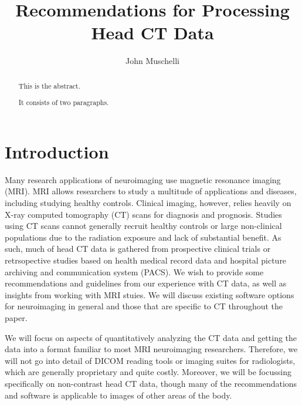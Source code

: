 \documentclass[]{elsarticle} %
\begin{document}
\begin{frontmatter}

  \title{Recommendations for Processing Head CT Data}
    \author[JHSPH]{John Muschelli}
  
      \address[JHSPH]{Johns Hopkins Bloomberg School of Public Health, Department of
Biostatistics, 615 N Wolfe St, Baltimore, MD, 21205}
    \address[JHMI]{Johns Hopkins Hospital, Department of Neurology, 601 N Caroline St,
Baltimore, MD 21205}
    \address[BIOS]{Brain Injury Outcomes, Johns Hopkins University, 750 East Pratt Street,
Baltimore, MD 21202}
  
  \begin{abstract}
  This is the abstract.
  
  It consists of two paragraphs.
  \end{abstract}
  
 \end{frontmatter}

\hypertarget{introduction}{%
\section{Introduction}\label{introduction}}

Many research applications of neuroimaging use magnetic resonance
imaging (MRI). MRI allows researchers to study a multitude of
applications and diseases, including studying healthy controls. Clinical
imaging, however, relies heavily on X-ray computed tomography (CT) scans
for diagnosis and prognosis. Studies using CT scans cannot generally
recruit healthy controls or large non-clinical populations due to the
radiation exposure and lack of substantial benefit. As such, much of
head CT data is gathered from prospective clinical trials or
retrsopective studies based on health medical record data and hospital
picture archiving and communication system (PACS). We wish to provide
some recommendations and guidelines from our experience with CT data, as
well as insights from working with MRI stuies. We will discuss existing
software options for neuroimaging in general and those that are specific
to CT throughout the paper.

We will focus on aspects of quantitatively analyzing the CT data and
getting the data into a format familiar to most MRI neuroimaging
researchers. Therefore, we will not go into detail of DICOM reading
tools or imaging suites for radiologists, which are generally
proprietary and quite costly. Moreover, we will be focussing
specifically on non-contrast head CT data, though many of the
recommendations and software is applicable to images of other areas of
the body.
\end{document}

